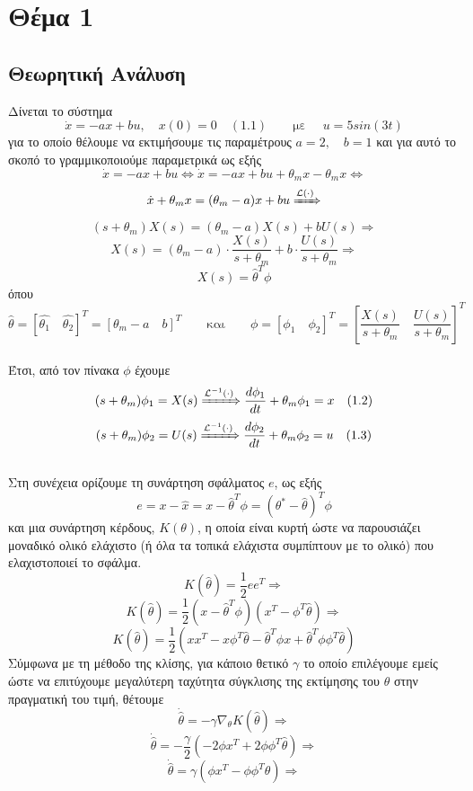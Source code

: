 \documentclass[12pt]{article}
\newcommand{\Lagr}{\mathcal{L}}
\begin{document}
\newpage
\section{Θέμα 1 }
\subsection{Θεωρητική Ανάλυση}
Δίνεται το σύστημα
\[ \dot{x}=-ax+bu , \quad x(0)=0 \quad (1.1) \qquad \text{με }  \quad u=5sin(3t) \]
για το οποίο θέλουμε να εκτιμήσουμε τις παραμέτρους $a=2 ,\quad b=1$ και για αυτό το σκοπό το γραμμικοποιούμε παραμετρικά ως εξής
\[ \dot{x}=-ax+bu \Leftrightarrow \dot{x}=-ax+bu+\theta_mx-\theta_mx \Leftrightarrow\]
\[\dot{x}+\theta_mx=(\theta_m-a)x+bu \xRightarrow{\Lagr(\cdot)} \]
\[ (s+\theta_m)X(s)=(\theta_m-a)X(s)+bU(s) \Rightarrow\]
\[ X(s)=(\theta_m-a)\cdot \frac{ X(s)}{s+\theta_m} +b \cdot \frac{U(s)}{s+\theta_m} \Rightarrow \]
\[X(s)=\hat{\theta}^{T}\phi \]
όπου
\[
\hat{\theta}=\left[ \hat{\theta_{1}} \quad \hat{\theta_{2}} \right]^{T}=[\theta_m-a \quad b]^{T} \qquad \text{και} \qquad \phi=\left[ \phi_{1} \quad \phi_{2} \right]^{T}=\left[\frac{ X(s)}{s+\theta_m} \quad \frac{ U(s)}{s+\theta_m}\right]^{T} \]
\\
Έτσι, από τον πίνακα $\phi$ έχουμε
\[ (s+\theta_m)\phi_1=X(s) \xRightarrow{\Lagr^{-1}(\cdot)} \frac{d\phi_{1}}{dt}+\theta_m\phi_{1}=x \quad (1.2)\]
\[ (s+\theta_m)\phi_2=U(s) \xRightarrow{\Lagr^{-1}(\cdot)} \frac{d\phi_{2}}{dt}+\theta_m\phi_{2}=u \quad (1.3)\]
\\
Στη συνέχεια ορίζουμε τη συνάρτηση σφάλματος $e$, ως εξής
\[ e=x-\hat{x}=x-\hat{\theta}^{T}\phi = (\theta^{*}-\hat{\theta})^{T} \phi \]
και μια συνάρτηση κέρδους, $K(\theta)$, η οποία είναι κυρτή ώστε να παρουσιάζει μοναδικό ολικό ελάχιστο (ή όλα τα τοπικά ελάχιστα συμπίπτουν με το ολικό) που ελαχιστοποιεί το σφάλμα.
\[ K(\hat{\theta})=\frac{1}{2}ee^{T} \Rightarrow\]
\[ K(\hat{\theta})=\frac{1}{2}(x-\hat{\theta}^{T}\phi)(x^{T}-\phi^{T}\hat{\theta}) \Rightarrow\]
\[ K(\hat{\theta})=\frac{1}{2}(xx^{T}-x\phi^{T}\hat{\theta} - \hat{\theta}^{T}\phi x+\hat{\theta}^{T}\phi\phi^{T}\hat{\theta}) \]
Σύμφωνα με τη μέθοδο της κλίσης, για κάποιο θετικό $\gamma$ το οποίο επιλέγουμε εμείς ώστε να επιτύχουμε μεγαλύτερη ταχύτητα σύγκλισης της εκτίμησης του $\hat{\theta}$ στην πραγματική του τιμή, θέτουμε
\[ \dot{\hat{\theta}}=-\gamma \nabla_{\theta} K(\hat{\theta})\Rightarrow\] 
\[\dot{\hat{\theta}}=-\frac{\gamma}{2}(-2\phi x^{T} +2\phi\phi^{T}\hat{\theta})\Rightarrow\] 
\[\dot{\hat{\theta}}= \gamma(\phi x^{T} -\phi\phi^{T}\hat{\theta})  \Rightarrow \]
\end{document}
